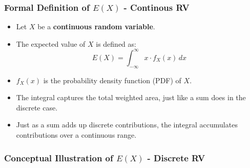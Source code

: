\documentclass[handout]{beamer} %
\begin{document}
\begin{frame} %
\frametitle{Formal Definition of \(E(X)\) - Continous RV}

\begin{itemize}
  \item Let $X$ be a \textbf{continuous random variable}.
  \item The expected value of $X$ is defined as:
  \pause
  \[
  E(X) = \int_{-\infty}^{\infty} x \cdot f_X(x) \, dx
  \]
  \pause
  \item \(f_X(x)\) is the probability density function (PDF) of \(X\).
  \pause
  \item The integral captures the total weighted area, just like a sum does in the discrete case.
  \pause
  \item Just as a sum adds up discrete contributions, the integral accumulates contributions over a continuous range.
\end{itemize}

\end{frame}


\begin{frame} %
    \frametitle{Conceptual Illustration of $E(X)$ - Discrete RV}

    \begin{figure}
        \centering
    \end{figure}

\end{frame}
\end{document}
